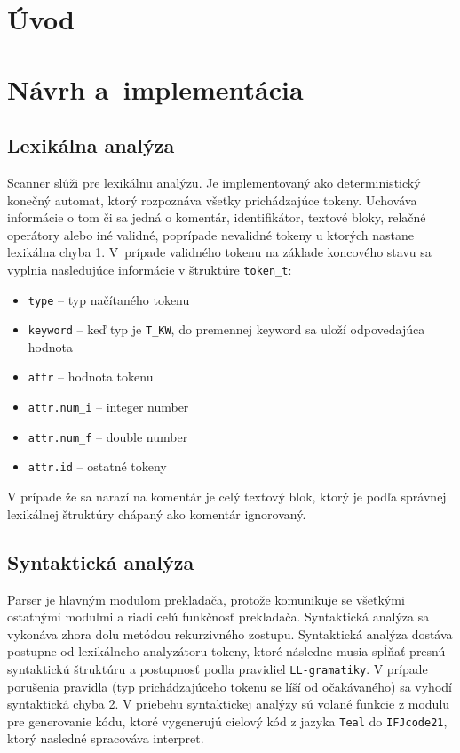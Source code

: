 \documentclass[a4paper, 11pt]{article}
\begin{document}
    \setcounter{page}{1}

    \section{Úvod}





    \section{Návrh a~implementácia}

    \subsection{Lexikálna analýza}
    Scanner slúži pre lexikálnu analýzu. Je implementovaný ako deterministický konečný automat, ktorý rozpoznáva všetky
    prichádzajúce tokeny. Uchováva informácie o tom či sa jedná o komentár, identifikátor, textové bloky, relačné
    operátory alebo iné validné, poprípade nevalidné tokeny u ktorých nastane lexikálna chyba 1. V~prípade validného
    tokenu na základe koncového stavu sa vyplnia nasledujúce informácie v štruktúre \texttt{token\_t}:
    \begin{itemize}
        \item \texttt{type}  --  typ načítaného tokenu
        \item \texttt{keyword} -- keď typ je \texttt{T\_KW}, do premennej keyword sa uloží odpovedajúca hodnota
        \item \texttt{attr} -- hodnota tokenu
        \item \texttt{attr.num\_i} -- integer number
        \item \texttt{attr.num\_f} -- double number
        \item \texttt{attr.id} -- ostatné tokeny
    \end{itemize}
    V prípade že sa narazí na komentár je celý textový blok, ktorý je podľa správnej
    lexikálnej štruktúry chápaný ako komentár ignorovaný.

    \subsection{Syntaktická analýza}
    Parser je hlavným modulom prekladača, protože komunikuje se všetkými ostatnými modulmi a riadi celú funkčnosť
    prekladača. Syntaktická analýza sa vykonáva zhora dolu metódou rekurzivného zostupu.
    Syntaktická analýza dostáva postupne od lexikálneho analyzátoru tokeny, ktoré následne musia spĺňať presnú
    syntaktickú štruktúru a postupnosť podla pravidiel \texttt{LL-gramatiky}.
    V prípade porušenia pravidla (typ prichádzajúceho tokenu se líší od očakávaného) sa vyhodí syntaktická chyba 2.
    V priebehu syntaktickej analýzy sú volané funkcie z modulu pre generovanie kódu, ktoré vygenerujú cielový kód z
    jazyka \texttt{Teal} do \texttt{IFJcode21}, ktorý nasledné spracováva interpret.
\end{document}
